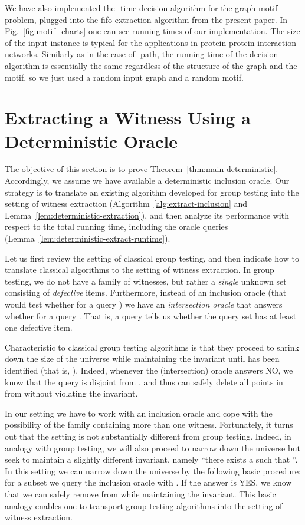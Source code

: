 \documentclass[11pt]{article}
\begin{document}
We have also implemented the -time decision algorithm \cite{BjorklundKaskiKowalik2013} for the graph motif problem, plugged into the fifo extraction algorithm from the present paper.
In Fig.~\ref{fig:motif_charts} one can see running times of our implementation.
The size of the input instance is typical for the applications in protein-protein interaction networks.
Similarly as in the case of -path, the running time of the decision algorithm is essentially the same regardless of the structure of the graph and the motif, so we just used a random input graph and a random motif.

\section{Extracting a Witness Using a Deterministic Oracle}
\label{sect:deterministic}

The objective of this section is to prove Theorem~\ref{thm:main-deterministic}. Accordingly, we assume we have available a deterministic inclusion oracle. Our strategy is to translate an existing algorithm developed for group testing into the setting of witness extraction (Algorithm~\ref{alg:extract-inclusion} and Lemma~\ref{lem:deterministic-extraction}), and then analyze its performance with respect to the total running time, including the oracle queries (Lemma~\ref{lem:deterministic-extract-runtime}).

Let us first review the setting of classical group testing, and then indicate how to translate classical algorithms to the setting of witness extraction. In group testing, we do not have a family of witnesses, but rather a {\em single} unknown set  consisting of {\em defective} items. Furthermore, instead of an inclusion oracle (that would test whether  for a query ) we have an {\em intersection oracle} that answers whether  for a query . That is, a query tells us whether the query set  has at least one defective item.

Characteristic to classical group testing algorithms is that they proceed to shrink down the size of the universe  while maintaining the invariant  until  has been identified (that is, ). Indeed, whenever the (intersection) oracle answers NO, we know that the query  is disjoint from , and thus can safely delete all points in  from  without violating the invariant. 

In our setting we have to work with an inclusion oracle and cope with the possibility of the family  containing more than one witness. Fortunately, it turns out that the setting is not substantially different from group testing. Indeed, in analogy with group testing, we will also proceed to narrow down the universe  but seek to maintain a slightly different invariant, namely ``there exists a  such that ''. In this setting we can narrow down the universe by the following basic procedure: for a subset  we query the inclusion oracle with . If the answer is YES, we know that we can safely remove  from  while maintaining the invariant. This basic analogy enables one to transport group testing algorithms into the setting of witness extraction.
\end{document}

